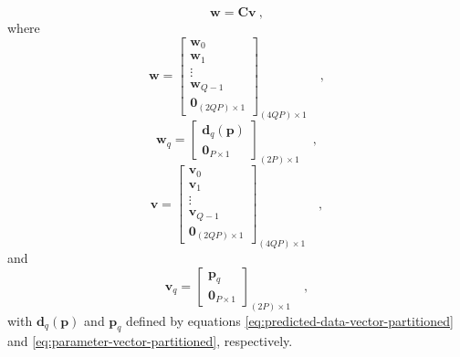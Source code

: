 \documentclass[manuscript,revised]{geophysics}
\begin{document}
\begin{equation}
\mathbf{w} = \mathbf{C} \mathbf{v} \: ,
\label{eq:embedding-BCCB-matrix-vector-product}
\end{equation}
where
\begin{equation}
\mathbf{w} = \begin{bmatrix}
\mathbf{w}_{0} \\
\mathbf{w}_{1} \\
\vdots \\
\mathbf{w}_{Q - 1} \\
\mathbf{0}_{(2QP) \times 1}
\end{bmatrix}_{(4QP) \times 1} \quad ,
\label{eq:w-vector}
\end{equation}
\begin{equation}
\mathbf{w}_{q} = \begin{bmatrix}
\mathbf{d}_{q}(\mathbf{p}) \\
\mathbf{0}_{P \times 1}
\end{bmatrix}_{(2P) \times 1}
\label{eq:wq-vector} \quad ,
\end{equation}
\begin{equation}
\mathbf{v} = \begin{bmatrix}
\mathbf{v}_{0} \\
\mathbf{v}_{1} \\
\vdots \\
\mathbf{v}_{Q - 1} \\
\mathbf{0}_{(2QP) \times 1}
\end{bmatrix}_{(4QP) \times 1} \quad ,
\label{eq:v-vector}
\end{equation}
and
\begin{equation}
\mathbf{v}_{q} = \begin{bmatrix}
\mathbf{p}_{q} \\
\mathbf{0}_{P \times 1}
\end{bmatrix}_{(2P) \times 1}
\label{eq:vq-vector} \quad ,
\end{equation}
with $\mathbf{d}_{q}(\mathbf{p})$ and $\mathbf{p}_{q}$ defined by
equations \ref{eq:predicted-data-vector-partitioned} and 
\ref{eq:parameter-vector-partitioned}, respectively.
\end{document}
